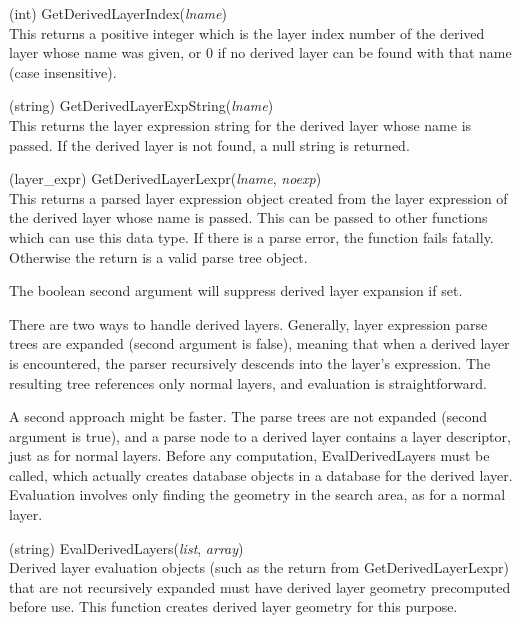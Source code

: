 \begin{description}
\item{(int) \vt GetDerivedLayerIndex({\it lname\/})}\\
This returns a positive integer which is the layer index number of the
derived layer whose name was given, or 0 if no derived layer can be
found with that name (case insensitive).

\item{(string) \vt GetDerivedLayerExpString({\it lname\/})}\\
This returns the layer expression string for the derived layer whose
name is passed.  If the derived layer is not found, a null string is
returned.

\item{(layer\_expr) \vt GetDerivedLayerLexpr({\it lname\/}, {\it noexp\/})}\\
This returns a parsed layer expression object created from the layer
expression of the derived layer whose name is passed.  This can be
passed to other functions which can use this data type.  If there is a
parse error, the function fails fatally.  Otherwise the return is a
valid parse tree object.

The boolean second argument will suppress derived layer expansion if
set.

There are two ways to handle derived layers.  Generally, layer
expression parse trees are expanded (second argument is false),
meaning that when a derived layer is encountered, the parser
recursively descends into the layer's expression.  The resulting tree
references only normal layers, and evaluation is straightforward.

A second approach might be faster.  The parse trees are not expanded
(second argument is true), and a parse node to a derived layer
contains a layer descriptor, just as for normal layers.  Before any
computation, {\vt EvalDerivedLayers} must be called, which actually
creates database objects in a database for the derived layer. 
Evaluation involves only finding the geometry in the search area, as
for a normal layer.

\item{(string) \vt EvalDerivedLayers({\it list\/}, {\it array\/})}\\
Derived layer evaluation objects (such as the return from {\vt
GetDerivedLayerLexpr}) that are not recursively expanded must have
derived layer geometry precomputed before use.  This function creates
derived layer geometry for this purpose.


\end{description}
